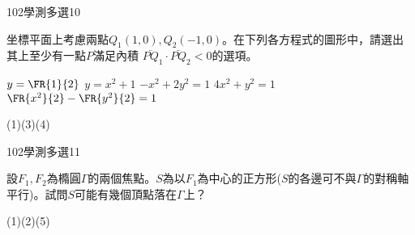     \begin{QUESTION}
        \begin{ExamInfo}{102}{學測}{多選}{10}
        \end{ExamInfo}
        \begin{ExamAnsRateInfo}{36}{60}{30}{18}
        \end{ExamAnsRateInfo}
        \begin{QBODY}
            坐標平面上考慮兩點${{Q}_{1}}(1,0),{{Q}_{2}}(-1,0)$。在下列各方程式的圖形中，請選出其上至少有一點$P$滿足內積 $\lvec{PQ_{1}}\cdot \lvec{PQ_{2}}<0$的選項。
		\begin{QOPS}
			\QOP $y=\FR{1}{2}$  
			\QOP $y={{x}^{2}}+1$ 
			\QOP $-{{x}^{2}}+2{{y}^{2}}=1$
			\QOP $4{{x}^{2}}+{{y}^{2}}=1$
			\QOP $\FR{{{x}^{2}}}{2}-\FR{{{y}^{2}}}{2}=1$
		\end{QOPS}
        \end{QBODY}
        \begin{QFROMS}
        \end{QFROMS}
        \begin{QTAGS}\end{QTAGS}
        \begin{QANS}
            (1)(3)(4)
        \end{QANS}
        \begin{QSOLLIST}
        \end{QSOLLIST}
        \begin{QEMPTYSPACE}
        \end{QEMPTYSPACE}
    \end{QUESTION}
    \begin{QUESTION}
        \begin{ExamInfo}{102}{學測}{多選}{11}
        \end{ExamInfo}
        \begin{ExamAnsRateInfo}{42}{58}{45}{23}
        \end{ExamAnsRateInfo}
        \begin{QBODY}
            設${{F}_{1}},{{F}_{2}}$為橢圓$\Gamma $的兩個焦點。$S$為以${{F}_{1}}$為中心的正方形($S$的各邊可不與$\Gamma $的對稱軸平行)。試問$S$可能有幾個頂點落在$\Gamma $上？
			\begin{QOPS}
				\QOP 1
				\QOP 2
				\QOP 3
				\QOP 4
				\QOP 0
			\end{QOPS}
        \end{QBODY}
        \begin{QFROMS}
        \end{QFROMS}
        \begin{QTAGS}\end{QTAGS}
        \begin{QANS}
            (1)(2)(5)
        \end{QANS}
        \begin{QSOLLIST}
        \end{QSOLLIST}
        \begin{QEMPTYSPACE}
        \end{QEMPTYSPACE}
    \end{QUESTION}
